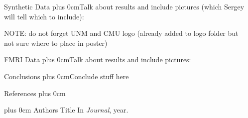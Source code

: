 \documentclass[final,hyperref={pdfpagelabels=false}]{beamer}
\renewcommand{\raggedright}{\leftskip=0.5cm \rightskip=0.5cm plus 0cm}
\begin{document}
\begin{frame}{}
\begin{columns}[t]
\begin{column}{.48\linewidth}
  

      \end{column}
      \begin{column}{.48\linewidth}
        \begin{block}{\Large Synthetic Data}
          \raggedright Talk about results and include pictures (which Sergey will tell which to include): \vskip5cm

         NOTE: do not forget UNM and CMU logo (already added to logo folder but not sure where to place in poster)

          \vskip5.5cm
        \end{block}
        
        \begin{block}{\Large FMRI Data}
          \raggedright Talk about results and include pictures: \vskip5cm
          \vskip5.5cm
        \end{block}

        \begin{block}{\Large Conclusions}
          \raggedright Conclude stuff here
        \end{block}
        \begin{block}{References}
          \raggedright
          \footnotesize
          \begin{thebibliography}{2}
            \raggedright
            Authors
            \newblock Title
            \newblock In \emph{Journal}, year.
          \end{thebibliography}
        \end{block}
      \end{column}
    \end{columns}
  \end{frame}
\end{document}
